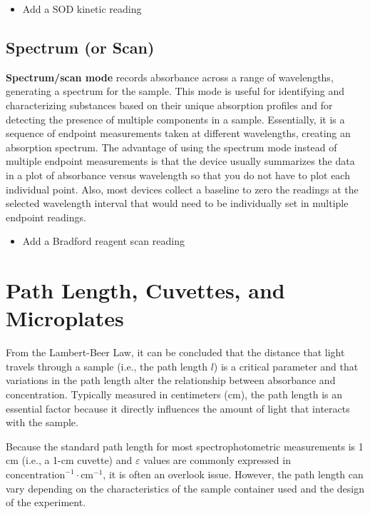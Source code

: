 \documentclass[
  9pt,
  american,
  a5paper,
  extrafontsizes,onecolumn,openright
  ]{memoir}
\providecommand{\tightlist}{%
  \setlength{\itemsep}{0pt}\setlength{\parskip}{0pt}}
\begin{document}
\begin{itemize}
\tightlist
\item
  Add a SOD kinetic reading
\end{itemize}

\subsection{Spectrum (or Scan)}\label{spectrum-or-scan}

\textbf{Spectrum/scan mode} records absorbance across a range of wavelengths, generating a spectrum for the sample. This mode is useful for identifying and characterizing substances based on their unique absorption profiles and for detecting the presence of multiple components in a sample. Essentially, it is a sequence of endpoint measurements taken at different wavelengths, creating an absorption spectrum. The advantage of using the spectrum mode instead of multiple endpoint measurements is that the device usually summarizes the data in a plot of absorbance versus wavelength so that you do not have to plot each individual point. Also, most devices collect a baseline to zero the readings at the selected wavelength interval that would need to be individually set in multiple endpoint readings.

\begin{itemize}
\tightlist
\item
  Add a Bradford reagent scan reading
\end{itemize}

\section{Path Length, Cuvettes, and Microplates}\label{path-length-cuvettes-and-microplates}

From the Lambert-Beer Law, it can be concluded that the distance that light travels through a sample (i.e., the path length \(l\)) is a critical parameter and that variations in the path length alter the relationship between absorbance and concentration. Typically measured in centimeters (cm), the path length is an essential factor because it directly influences the amount of light that interacts with the sample.

Because the standard path length for most spectrophotometric measurements is 1 cm (i.e., a 1-cm cuvette) and \(\varepsilon\) values are commonly expressed in \(\text{concentration}^{-1} \cdot \text{cm}^{-1}\), it is often an overlook issue. However, the path length can vary depending on the characteristics of the sample container used and the design of the experiment.
\end{document}
